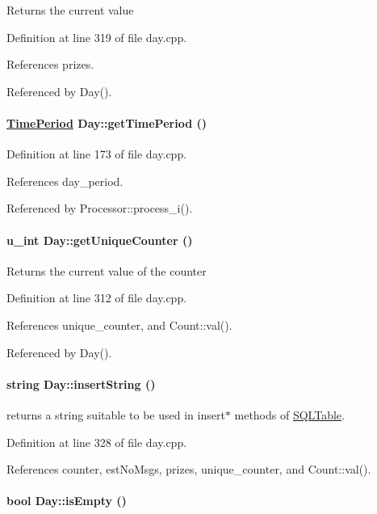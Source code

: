 Returns the current value 

Definition at line 319 of file day.cpp.

References prizes.

Referenced by Day().\hypertarget{classDay_Daya3}{
\paragraph[getTimePeriod]{\setlength{\rightskip}{0pt plus 5cm}\hyperlink{classTimePeriod}{Time\-Period} Day::get\-Time\-Period ()}\hfill}
\label{classDay_Daya3}




Definition at line 173 of file day.cpp.

References day\_\-period.

Referenced by Processor::process\_\-i().\hypertarget{classDay_Daya11}{
\paragraph[getUniqueCounter]{\setlength{\rightskip}{0pt plus 5cm}u\_\-int Day::get\-Unique\-Counter ()}\hfill}
\label{classDay_Daya11}


Returns the current value of the counter 

Definition at line 312 of file day.cpp.

References unique\_\-counter, and Count::val().

Referenced by Day().\hypertarget{classDay_Daya13}{
\paragraph[insertString]{\setlength{\rightskip}{0pt plus 5cm}string Day::insert\-String ()}\hfill}
\label{classDay_Daya13}


returns a string suitable to be used in insert$\ast$ methods of \hyperlink{classSQLTable}{SQLTable}. 

Definition at line 328 of file day.cpp.

References counter, est\-No\-Msgs, prizes, unique\_\-counter, and Count::val().\hypertarget{classDay_Daya15}{
\paragraph[isEmpty]{\setlength{\rightskip}{0pt plus 5cm}bool Day::is\-Empty ()}\hfill}
\label{classDay_Daya15}


